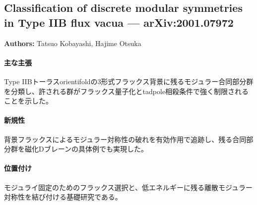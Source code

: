 \subsection{Classification of discrete modular symmetries in Type IIB flux vacua --- arXiv:2001.07972}

\textbf{Authors:} Tatsuo Kobayashi, Hajime Otsuka

\paragraph{主な主張}
Type IIBトーラスorientifoldの3形式フラックス背景に残るモジュラー合同部分群を分類し、許される群がフラックス量子化とtadpole相殺条件で強く制限されることを示した。 \cite{Kobayashi:2020hoc}

\paragraph{新規性}
背景フラックスによるモジュラー対称性の破れを有効作用で追跡し、残る合同部分群を磁化Dブレーンの具体例でも実現した。

\paragraph{位置付け}
モジュライ固定のためのフラックス選択と、低エネルギーに残る離散モジュラー対称性を結び付ける基礎研究である。
